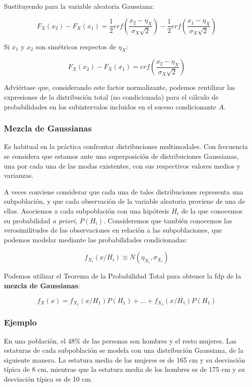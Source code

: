 \documentclass[11pt]{article}
\begin{document}
    Sustituyendo para la variable aleatoria Gaussiana:

\[F_X(x_2)-F_X(x_1)=
\frac{1}{2}erf(\frac{x_2-\eta_X}{\sigma_X\sqrt{2}}) - \frac{1}{2}erf(\frac{x_1-\eta_X}{\sigma_X\sqrt{2}})
\]

Si \(x_1\) y \(x_2\) son simétricos respectos de \(\eta_X\):

\[F_X(x_2)-F_X(x_1)= erf(\frac{x_2-\eta_X}{\sigma_X\sqrt{2}})\]

Adviértase que, considerando este factor normalizante, podemos
reutilizar las expresiones de la distribución total (no condicionada)
para el cálculo de probabilidades en los subintervalos incluidos en el
suceso condicionante \(A\).

    \hypertarget{mezcla-de-gaussianas}{%
\subsubsection*{Mezcla de Gaussianas}\label{mezcla-de-gaussianas}}

Es habitual en la práctica confrontar distribuciones multimodales. Con
frecuencia se considera que estamos ante una superposición de
distribuciones Gaussianas, una por cada una de las modas existentes, con
sus respectivos valores medios y varianzas.

A veces conviene considerar que cada una de tales distribuciones
representa una subpoblación, y que cada observación de la variable
aleatoria proviene de una de ellas. Asociemos a cada subpoblación con
una hipótesis \(H_i\) de la que conocemos su probabilidad \emph{a
priori}, \(P(H_i)\). Consideremos que también conocemos las
verosimilitudes de las observaciones en relación a las subpoblaciones,
que podemos modelar mediante las probabilidades condicionadas:

\[f_{X_i}(x/H_i) \equiv N(\eta_{X_i}, \sigma_{X_i})\]

Podemos utilizar el Teorema de la Probabilidad Total para obtener la fdp
de la \textbf{mezcla de Gaussianas}:

\[f_X(x) = f_{X_1}(x/H_1)P(H_1)+ \ldots + f_{X_1}(x/H_1)P(H_1)\]

    \hypertarget{ejemplo}{%
\subsubsection*{Ejemplo}\label{ejemplo}}

En una población, el \(48\%\) de las personas son hombres y el resto
mujeres. Las estaturas de cada subpoblación se modela con una
distribución Gaussiana, de la siguiente manera. La estatura media de las
mujeres es de 165 cm y su desviación típica de 8 cm, mientras que la
estatura media de los hombres es de 175 cm y su desviación típica es de
10 cm.
\end{document}
